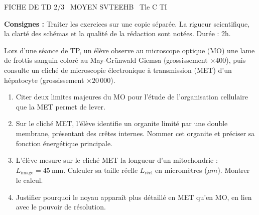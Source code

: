 \documentclass[11pt]{article}
\begin{document}
\begin{tcolorbox}[enhanced,colback=popink,colframe=popink,arc=10pt,boxrule=0pt,left=12pt,right=12pt,top=9pt,bottom=9pt]
{\color{white}\popxbold\small FICHE DE TD 2/3 \textbullet\ MOYEN \hfill SVTEEHB \textbullet\ Tle C TI\par}
\end{tcolorbox}
\vspace{4pt}
\noindent \textbf{Consignes :} Traiter les exercices sur une copie séparée. La rigueur scientifique, la clarté des schémas et la qualité de la rédaction sont notées. Durée : 2h.

\begin{exercice}
Lors d'une séance de TP, un élève observe au microscope optique (MO) une lame de frottis sanguin coloré au May-Grünwald Giemsa (grossissement $\times 400$), puis consulte un cliché de microscopie électronique à transmission (MET) d'un hépatocyte (grossissement $\times 20\,000$).
\begin{enumerate}
    \item Citer deux limites majeures du MO pour l'étude de l'organisation cellulaire que la MET permet de lever.
    \item Sur le cliché MET, l'élève identifie un organite limité par une double membrane, présentant des crêtes internes. Nommer cet organite et préciser sa fonction énergétique principale.
    \item L'élève mesure sur le cliché MET la longueur d'un mitochondrie : $L_{\text{image}} = \SI{45}{\milli\metre}$. Calculer sa taille réelle $L_{\text{réel}}$ en micromètres ($\mu m$). Montrer le calcul.
    \item Justifier pourquoi le noyau apparaît plus détaillé en MET qu'en MO, en lien avec le pouvoir de résolution.
\end{enumerate}
\end{exercice}
\end{document}
